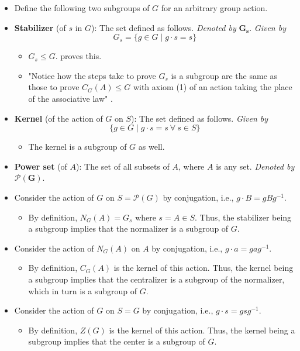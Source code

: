 \documentclass[../notes.tex]{subfiles}
\begin{document}
\begin{itemize}
    \item Define the following two subgroups of $G$ for an arbitrary group action.
    \item \textbf{Stabilizer} (of $s$ in $G$): The set defined as follows. \emph{Denoted by} $\bm{G_s}$. \emph{Given by}
    \begin{equation*}
        G_s = \{g\in G\mid g\cdot s=s\}
    \end{equation*}
    \begin{itemize}
        \item $G_s\leq G$. \textcite{bib:DummitFoote} proves this.
        \item "Notice how the steps take to prove $G_s$ is a subgroup are the same as those to prove $C_G(A)\leq G$ with axiom (1) of an action taking the place of the associative law" \parencite[51]{bib:DummitFoote}.
    \end{itemize}
    \item \textbf{Kernel} (of the action of $G$ on $S$): The set defined as follows. \emph{Given by}
    \begin{equation*}
        \{g\in G\mid g\cdot s=s\ \forall\ s\in S\}
    \end{equation*}
    \begin{itemize}
        \item The kernel is a subgroup of $G$ as well.
    \end{itemize}
    \item \textbf{Power set} (of $A$): The set of all subsets of $A$, where $A$ is any set. \emph{Denoted by} $\bm{\mathcal{P}(G)}$.
    \item Consider the action of $G$ on $S=\mathcal{P}(G)$ by conjugation, i.e., $g\cdot B=gBg^{-1}$.
    \begin{itemize}
        \item By definition, $N_G(A)=G_s$ where $s=A\in S$. Thus, the stabilizer being a subgroup implies that the normalizer is a subgroup of $G$.
    \end{itemize}
    \item Consider the action of $N_G(A)$ on $A$ by conjugation, i.e., $g\cdot a=gag^{-1}$.
    \begin{itemize}
        \item By definition, $C_G(A)$ is the kernel of this action. Thus, the kernel being a subgroup implies that the centralizer is a subgroup of the normalizer, which in turn is a subgroup of $G$.
    \end{itemize}
    \item Consider the action of $G$ on $S=G$ by conjugation, i.e., $g\cdot s=gsg^{-1}$.
    \begin{itemize}
        \item By definition, $Z(G)$ is the kernel of this action. Thus, the kernel being a subgroup implies that the center is a subgroup of $G$.
    \end{itemize}
\end{itemize}
\end{document}
